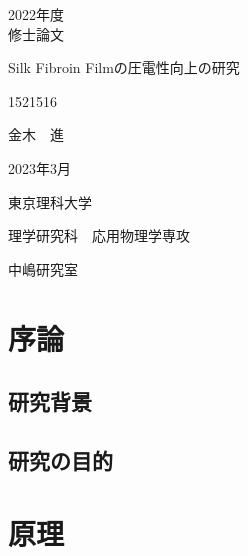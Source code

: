 \documentclass[dvipdfmx,12pt,a4paper]{jreport}
\begin{document}
	\begin{titlepage}
		
		\begin{center}
			
			\vspace{20truept}
			{\LARGE 2022年度}\\
			\vspace{15truept}
			{\LARGE 修士論文}
			
			\vspace{50truept}
			
			{\Huge Silk Fibroin Filmの圧電性向上の研究}\\
			\vspace{10truept}
			
			\vspace*{280truept}
			
			{\LARGE 1521516}\\
			\vspace{5truept}
			
			{\LARGE 金木　進}\\
			\vspace{60truept}
			
			{\LARGE 2023年3月}
			\vspace{30truept}
			
			{\LARGE 東京理科大学}\\
			\vspace{15truept}
			
			{\LARGE 理学研究科　応用物理学専攻}\\
			\vspace{15truept}
			
			{\LARGE 中嶋研究室}\\
			
		\end{center}
		
		
	\end{titlepage}
  \thispagestyle{empty}
	\clearpage
\addtocounter{page}{0}
\tableofcontents
  \chapter{序論}
		\section{研究背景}
		\section{研究の目的}
	\chapter{原理}
\end{document}
